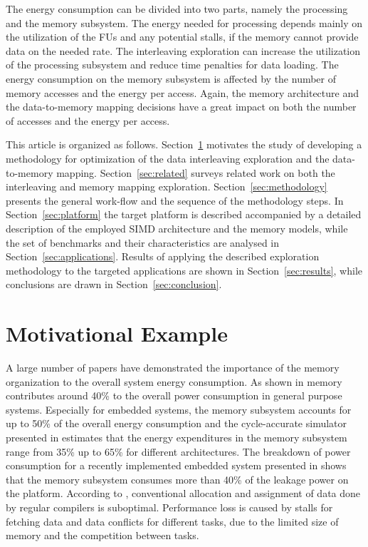 \documentclass[prodmode,acmtodaes]{acmsmall}
\begin{document}
The energy consumption can be divided into two parts, namely the processing and the memory subsystem. 
The energy needed for processing depends mainly on the utilization of the FUs and any potential stalls, if the memory cannot provide data on the needed rate.
The interleaving exploration can increase the utilization of the processing subsystem and reduce time penalties for data loading.   
The energy consumption on the memory subsystem is affected by the number of memory accesses and the energy per access. 
Again, the memory architecture and the data-to-memory mapping decisions have a great impact on both the number of accesses and the energy per access.

This article is organized as follows. 
Section~\ref{sec:motivational} motivates the study of developing a methodology for optimization of the data interleaving exploration and the data-to-memory mapping. 
Section~\ref{sec:related} surveys related work on both the interleaving and memory mapping exploration.
Section~\ref{sec:methodology} presents the general work-flow and the sequence of the methodology steps.
In Section~\ref{sec:platform} the target platform is described accompanied by a detailed description of the employed SIMD architecture and the memory models, while the set of benchmarks and their characteristics are analysed in Section~\ref{sec:applications}. 
Results of applying the described exploration methodology to the targeted applications are shown in Section~\ref{sec:results}, while conclusions are drawn in Section~\ref{sec:conclusion}. 


\section{Motivational Example}
\label{sec:motivational}

A large number of papers have demonstrated the importance of the memory organization to the overall system energy consumption. 
As shown in \cite{Gonzalez1996} memory contributes around 40\% to the overall power consumption in general purpose systems. 
Especially for embedded systems, the memory subsystem accounts for up to 50\% of the overall energy consumption \cite{Che09} and the cycle-accurate simulator presented in \cite{Ben99} estimates that the energy expenditures in the memory subsystem range from 35\% up to 65\% for different architectures. 
The breakdown of power consumption for a recently implemented embedded system presented in \cite{Hul11} shows that the memory subsystem consumes more than 40\% of the leakage power on the platform. 
According to \cite{tcm}, conventional allocation and assignment of data done by regular compilers is suboptimal. 
Performance loss is caused by stalls for fetching data and data conflicts for different tasks, due to the limited size of memory and the competition between tasks. 
\end{document}
